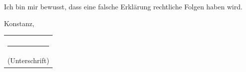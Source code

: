{  \noindent
  Ich bin mir bewusst, dass eine falsche Erklärung rechtliche Folgen haben wird.\\

  \vspace*{0.5cm}

  \noindent
  Konstanz, \abgabedatum \hfill \begin{tabular}{c} \\ \\ \rule{5cm}{1pt} \\ (Unterschrift)\end{tabular}

  \intentionallyBlankPage

}
